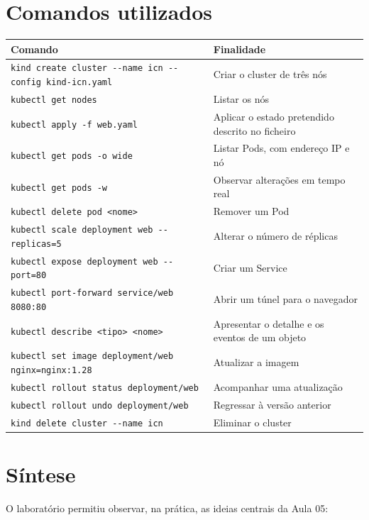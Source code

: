 \documentclass[11pt,a4paper]{article}
\newcommand{\cmd}[1]{\texttt{#1}}
\begin{document}
\section*{Comandos utilizados}

\begin{center}
\small
\begin{tabular}{>{\raggedright\arraybackslash}p{7.2cm} >{\raggedright\arraybackslash}p{7.6cm}}
\toprule
\textbf{Comando} & \textbf{Finalidade} \\
\midrule
\cmd{kind create cluster -{}-name icn -{}-config kind-icn.yaml} & Criar o cluster de três nós \\
\cmd{kubectl get nodes} & Listar os nós \\
\cmd{kubectl apply -f web.yaml} & Aplicar o estado pretendido descrito no ficheiro \\
\cmd{kubectl get pods -o wide} & Listar Pods, com endereço IP e nó \\
\cmd{kubectl get pods -w} & Observar alterações em tempo real \\
\cmd{kubectl delete pod <nome>} & Remover um Pod \\
\cmd{kubectl scale deployment web -{}-replicas=5} & Alterar o número de réplicas \\
\cmd{kubectl expose deployment web -{}-port=80} & Criar um Service \\
\cmd{kubectl port-forward service/web 8080:80} & Abrir um túnel para o navegador \\
\cmd{kubectl describe <tipo> <nome>} & Apresentar o detalhe e os eventos de um objeto \\
\cmd{kubectl set image deployment/web nginx=nginx:1.28} & Atualizar a imagem \\
\cmd{kubectl rollout status deployment/web} & Acompanhar uma atualização \\
\cmd{kubectl rollout undo deployment/web} & Regressar à versão anterior \\
\cmd{kind delete cluster -{}-name icn} & Eliminar o cluster \\
\bottomrule
\end{tabular}
\end{center}

\section*{Síntese}

O laboratório permitiu observar, na prática, as ideias centrais da Aula 05:
\end{document}
